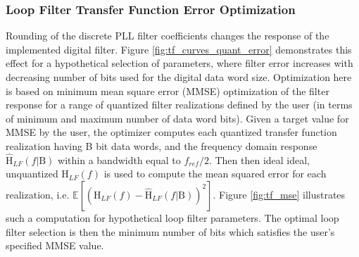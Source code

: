 \subsubsection{Loop Filter Transfer Function Error Optimization}
Rounding of the discrete PLL filter coefficients changes the response of the implemented digital filter. Figure \ref{fig:tf_curves_quant_error} demonstrates this effect for a hypothetical selection of parameters, where filter error increases with decreasing number of bits used for the digital data word size. Optimization here is based on minimum mean square error (MMSE) optimization of the filter response for a range of quantized filter realizations defined by the user (in terms of minimum and maximum number of data word bits). Given a target value for MMSE by the user, the optimizer computes each quantized transfer function realization having B bit data words, and the frequency domain response $\hat{\text{H}}_{LF}(f|\text{B})$ within a bandwidth equal to $f_{ref}/2$. Then then ideal ideal, unquantized $\text{H}_{LF}(f)$ is used to compute the mean squared error for each realization, i.e. $\mathbb{E}[(\text{H}_{LF}(f)-\hat{\text{H}}_{LF}(f|\text{B}))^2]$. Figure \ref{fig:tf_mse} illustrates such a computation for hypothetical loop filter parameters. The optimal loop filter selection is then the minimum number of bits which satisfies the user's specified MMSE value.

